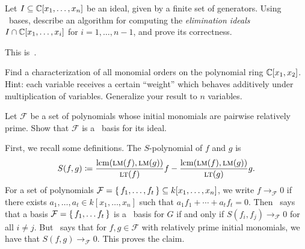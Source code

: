 \documentclass[letterpaper, 11pt, oneside]{book}
\begin{document}
\begin{exercise}
  Let $I \subseteq \mathbb{C}[x_{1}, \ldots, x_{n}]$ be an ideal, given by a finite set of generators.
  Using \Grobner\ bases, describe an algorithm for computing the \emph{elimination ideals} $I \cap \mathbb{C}[x_{1}, \ldots, x_{i}]$ for $i = 1, \ldots, n - 1$, and prove its correctness.
\end{exercise}
\begin{pf}
  This is~\cite[Chapter 3, \S 1, Theorem 2]{book:IVA}.
\end{pf}

\begin{exercise}
  Find a characterization of all monomial orders on the polynomial ring $\mathbb{C}[x_{1}, x_{2}]$.
  Hint: each variable receives a certain ``weight'' which behaves additively under multiplication of variables.
  Generalize your result to $n$ variables.
\end{exercise}
\begin{pf}
\end{pf}

\begin{exercise}
  Let $\mathcal{F}$ be a set of polynomials whose initial monomials are pairwise relatively prime.
  Show that $\mathcal{F}$ is a \Grobner\ basis for its ideal.
\end{exercise}
\begin{pf}
  First, we recall some definitions.
  The $S$-polynomial of $f$ and $g$ is
  \[
    S(f, g) \coloneqq \frac{\operatorname{lcm}(\operatorname{\textsc{lm}}(f), \operatorname{\textsc{lm}}(g))}{\operatorname{\textsc{lt}}(f)} f - \frac{\operatorname{lcm}(\operatorname{\textsc{lm}}(f), \operatorname{\textsc{lm}}(g))}{\operatorname{\textsc{lt}}(g)} g.
  \]
  For a set of polynomials $\mathcal{F} = \set{f_{1}, \ldots, f_{t}} \subseteq k[x_{1}, \ldots, x_{n}]$, we write $f \to_{\mathcal{F}} 0$ if there exists $a_{1}, \ldots, a_{t} \in k[x_{1}, \ldots, x_{n}]$ such that $a_{1} f_{1} + \cdots + a_{t} f_{t} = 0$.
  Then~\cite[Chapter 2, \S 9, Theorem 3]{book:IVA} says that a basis $\mathcal{F} = \set{f_{1}, \ldots f_{t}}$ is a \Grobner\ basis for $G$ if and only if $S(f_{i}, f_{j}) \to_{\mathcal{F}} 0$ for all $i \neq j$.
  But~\cite[Chapter 2, \S 9, Proposition 4]{book:IVA} says that for $f, g \in \mathcal{F}$ with relatively prime initial monomials, we have that $S(f, g) \to_{\mathcal{F}} 0$.
  This proves the claim.
\end{pf}

\printbibliography
\end{document}
